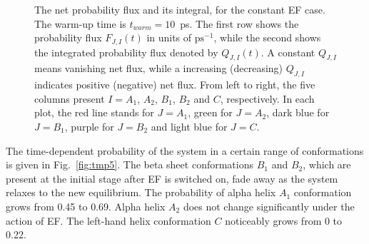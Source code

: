 \documentclass[a4paper,preprint,unsortedaddress,onecolumn]{revtex4-1}
\begin{document}
\begin{figure}
  \caption{
    The net probability flux and its integral, for the constant EF case.
    The warm-up time is $t_{warm} = 10$~ps.
    The first row shows the probability flux $F_{J,I}(t)$ in units of $\textrm{ps}^{-1}$, while the second
    shows the integrated  probability flux denoted by $Q_{J,I}(t)$.
    A constant $Q_{J,I}$ means vanishing net flux, while a increasing (decreasing)
    $Q_{J,I}$ indicates positive (negative) net flux.
    From left to right, the five
    columns present $I = A_1$, $A_2$, $B_1$, $B_2$ and
    $C$, respectively. In each plot, the red line stands for $J=A_1$,
    green for $J=A_2$, dark blue for $J=B_1$, purple for $J=B_2$ and light blue
    for $J=C$. 
    }
  \label{fig:tmp6}
\end{figure}



The time-dependent probability of the system in a certain range of conformations is given in
Fig.~\ref{fig:tmp5}. The beta sheet conformations $B_1$ and $B_2$,
which are present at the initial stage after EF is switched on,
fade away as the system relaxes to the new equilibrium. The
probability of alpha helix $A_1$ conformation grows from 0.45 to 0.69.
Alpha helix $A_2$  does not change significantly  under the action of EF.
The left-hand helix conformation $C$ noticeably grows from 0 to 0.22.
\end{document}
